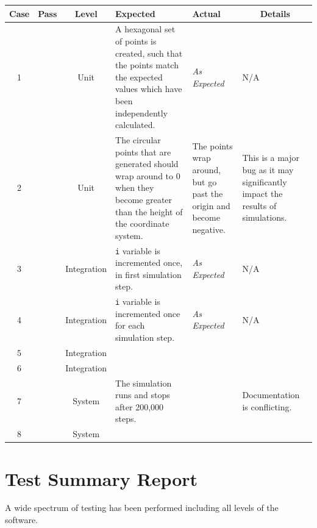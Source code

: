 \documentclass[11pt]{article}
\newcommand{\cmark}{\ding{51}}%
\newcommand{\xmark}{\ding{55}}
\begin{document}
\begin{adjustbox}{center}
\begin{tabular}{|c|c|c|p{10em}|p{10em}|p{10em}|}
	\hline
	\textbf{Case} & \textbf{Pass} & \textbf{Level} & \textbf{Expected} & \textbf{Actual} & \multicolumn{1}{c|}{\textbf{Details}} \\
	\hline
	1 & \textcolor{pass_grn}{\cmark} & Unit & A hexagonal set of points is created, such that the points match the expected values which have been independently calculated. & \textit{As Expected} & N/A \\
	\hline
	2 & \textcolor{fail_red}{\xmark} & Unit & The circular points that are generated should wrap around to 0 when they become greater than the height of the coordinate system. & The points wrap around, but go past the origin and become negative. & This is a major bug as it may significantly impact the results of simulations. \\
	\hline
	3 & \textcolor{pass_grn}{\cmark} & Integration & \texttt{i} variable is incremented once, in first simulation step. & \textit{As Expected} & N/A\\
	\hline
	4 & \textcolor{pass_grn}{\cmark} & Integration & \texttt{i} variable is incremented once for each simulation step. & \textit{As Expected} & N/A \\
	\hline
	5 & \textcolor{pass_grn}{\cmark} & Integration &  & & \\
	\hline
	6 & \textcolor{pass_grn}{\cmark} & Integration &  &  &  \\
	\hline
	7 & \textcolor{pass_grn}{\cmark} & System & The simulation runs and stops after 200,000 steps. &  & Documentation is conflicting.\\
	\hline
	8 & \textcolor{pass_grn}{\cmark} & System &&& \\
	\hline
\end{tabular}
\end{adjustbox}

\newpage
\section{Test Summary Report}%
A wide spectrum of testing has been performed including all levels of the software.
\\
\end{document}
